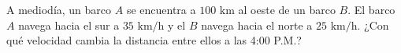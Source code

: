 \item A mediodía, un barco $A$ se encuentra a $100 \text{ km}$ al oeste de un barco $B$. El barco $A$ navega hacia el sur a $35 \text{ km/h}$ y el $B$ navega hacia el norte a $25 \text{ km/h}$. ¿Con qué velocidad cambia la distancia entre ellos a las 4:00 P.M.?

